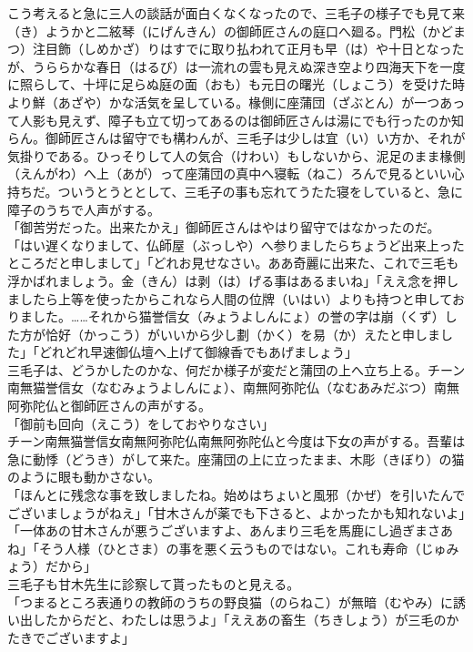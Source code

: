 \documentclass{book}
\begin{document}
こう考えると急に三人の談話が面白くなくなったので、三毛子の様子でも見て来（き）ようかと二絃琴（にげんきん）の御師匠さんの庭口へ廻る。門松（かどまつ）注目飾（しめかざ）りはすでに取り払われて正月も早（は）や十日となったが、うららかな春日（はるび）は一流れの雲も見えぬ深き空より四海天下を一度に照らして、十坪に足らぬ庭の面（おも）も元日の曙光（しょこう）を受けた時より鮮（あざや）かな活気を呈している。椽側に座蒲団（ざぶとん）が一つあって人影も見えず、障子も立て切ってあるのは御師匠さんは湯にでも行ったのか知らん。御師匠さんは留守でも構わんが、三毛子は少しは宜（い）い方か、それが気掛りである。ひっそりして人の気合（けわい）もしないから、泥足のまま椽側（えんがわ）へ上（あが）って座蒲団の真中へ寝転（ねこ）ろんで見るといい心持ちだ。ついうとうととして、三毛子の事も忘れてうたた寝をしていると、急に障子のうちで人声がする。\\
「御苦労だった。出来たかえ」御師匠さんはやはり留守ではなかったのだ。\\
「はい遅くなりまして、仏師屋（ぶっしや）へ参りましたらちょうど出来上ったところだと申しまして」「どれお見せなさい。ああ奇麗に出来た、これで三毛も浮かばれましょう。金（きん）は剥（は）げる事はあるまいね」「ええ念を押しましたら上等を使ったからこれなら人間の位牌（いはい）よりも持つと申しておりました。\ldots{}\ldots{}それから猫誉信女（みょうよしんにょ）の誉の字は崩（くず）した方が恰好（かっこう）がいいから少し劃（かく）を易（か）えたと申しました」「どれどれ早速御仏壇へ上げて御線香でもあげましょう」\\
三毛子は、どうかしたのかな、何だか様子が変だと蒲団の上へ立ち上る。チーン南無猫誉信女（なむみょうよしんにょ）、南無阿弥陀仏（なむあみだぶつ）南無阿弥陀仏と御師匠さんの声がする。\\
「御前も回向（えこう）をしておやりなさい」\\
チーン南無猫誉信女南無阿弥陀仏南無阿弥陀仏と今度は下女の声がする。吾輩は急に動悸（どうき）がして来た。座蒲団の上に立ったまま、木彫（きぼり）の猫のように眼も動かさない。\\
「ほんとに残念な事を致しましたね。始めはちょいと風邪（かぜ）を引いたんでございましょうがねえ」「甘木さんが薬でも下さると、よかったかも知れないよ」「一体あの甘木さんが悪うございますよ、あんまり三毛を馬鹿にし過ぎまさあね」「そう人様（ひとさま）の事を悪く云うものではない。これも寿命（じゅみょう）だから」\\
三毛子も甘木先生に診察して貰ったものと見える。\\
「つまるところ表通りの教師のうちの野良猫（のらねこ）が無暗（むやみ）に誘い出したからだと、わたしは思うよ」「ええあの畜生（ちきしょう）が三毛のかたきでございますよ」\\
\end{document}
